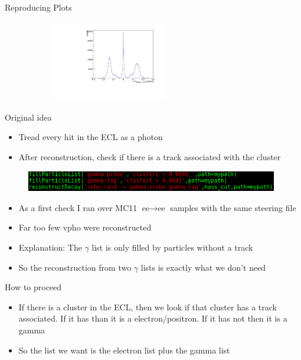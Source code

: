 \documentclass[10pt]{beamer}
\begin{document}
{\begin{frame}{Reproducing Plots}
\begin{figure}
\begin{subfigure}{.5\textwidth}
		\label{fig:sub1}
	\end{subfigure}%
\begin{subfigure}{.5\textwidth}
\centering
\includegraphics[width=5cm]{Plots/DeltaPhi.pdf}

\label{fig:sub2}
\end{subfigure}

\label{fig:test}
	\end{figure}
	
	
\end{frame}


\begin{frame}{Original idea}
		\begin{itemize}
			
		\item Tread every hit in the ECL as a photon
		\item After reconstruction, check if there is a track associated with the cluster
		
	\end{itemize}
	
\begin{figure}
	\includegraphics[width=11cm]{Plots/oldSc}
\end{figure}
\begin{itemize}
	\item As a first check I ran over MC11 $\textrm{ee}\rightarrow\textrm{ee}$ samples with the same steering file
	\item Far too few vpho were reconstructed
	\item Explanation: The $\gamma$ list is only filled by particles without a track
	\item So the reconstruction from two $\gamma$ lists is exactly what we don't need
\end{itemize}
\end{frame}



\begin{frame}{How to proceed}
	\begin{itemize}
		\item If there is a cluster in the ECL, then we look if that cluster has a track associated. If it has than it is a electron/positron. If it has not then it is a gamma 
		\item So the list we want is the electron list plus the gamma list
		

\end{itemize}
\end{frame}}
\end{document}
